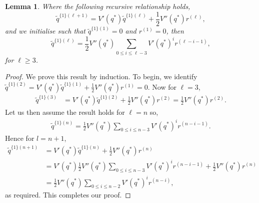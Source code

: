 \documentclass{article}
\theoremstyle{plain}
\newtheorem{lemma}[theorem]{Lemma}
\theoremstyle{definition}
\theoremstyle{remark}
\begin{document}
\begin{lemma}
    \label{lem:app_nlo_eq}
    Where the following recursive relationship holds,
    \begin{equation}
        \tilde{q}^{\{1\}(\ell+1)} =  V' \left( q^{*}\right) \tilde{q}^{\{1\}(\ell)} + \frac{1}{2} V''\left( q^{*}\right) r^{(\ell)},
    \end{equation}
    and we initialise such that $\tilde{q}^{\{1\}(1)}= 0$ and $r^{(1)}=0$, then
    \begin{equation}
        \tilde{q}^{\{1\}(\ell)} = \frac{1}{2}V''\left( q^{*}\right) \sum_{0\leq i \leq \ell-3} V' \left( q^{*} \right)^i r^{(\ell-i-1)},
    \end{equation}
    for $\ell\geq 3$.
\end{lemma}
\begin{proof}
    We prove this result by induction. To begin, we identify $\tilde{q}^{\{1\}(2)}= V' \left( q^{*}\right) \tilde{q}^{\{1\}(1)} + \frac{1}{2} V''\left( q^{*}\right) r^{(1)} =0 $. Now for $\ell=3$,
\begin{align}
    \tilde{q}^{\{1\}(3)} &=V' \left( q^{*}\right) \tilde{q}^{\{1\}(2)} + \frac{1}{2} V''\left( q^{*}\right) r^{(2)} = \frac{1}{2} V''\left( q^{*}\right) r^{(2)}.
\end{align}
Let us then assume the result holds for $\ell=n$ so,
\begin{align}
    \tilde{q}^{\{1\}(n)} = \frac{1}{2}V''\left( q^{*}\right) \sum_{0\leq i \leq n-3} V' \left( q^{*} \right)^i r^{(n-i-1)}.
\end{align}
Hence for $l=n+1$,
\begin{align}
    \tilde{q}^{\{1\}(n+1)} &=  V' \left( q^{*}\right) \tilde{q}^{\{1\}(n)} + \frac{1}{2} V''\left( q^{*}\right) r^{(n)} \\
    &=  V' \left( q^{*}\right)  \frac{1}{2}V''\left( q^{*}\right) \sum_{0\leq i \leq n-3} V' \left( q^{*} \right)^i r^{(n-i-1)}  + \frac{1}{2} V''\left( q^{*}\right) r^{(n)} \\
    &=  \frac{1}{2}V''\left( q^{*}\right) \sum_{0\leq i \leq n-2} V' \left( q^{*} \right)^i r^{(n-i)},
\end{align}
as required. This completes our proof.
\end{proof}
\end{document}
